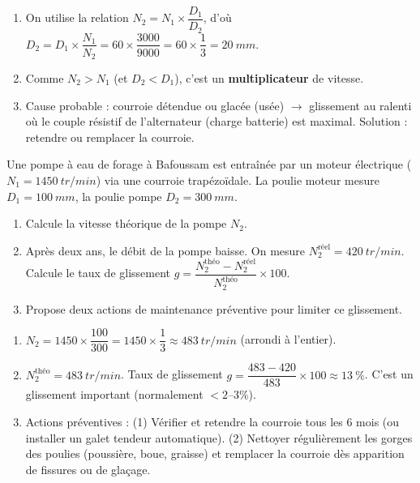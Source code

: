 \documentclass[11pt]{article}
\begin{document}
\begin{corrige}
\begin{enumerate}
\item On utilise la relation $N_2 = N_1 \times \dfrac{D_1}{D_2}$, d'où $D_2 = D_1 \times \dfrac{N_1}{N_2} = 60 \times \dfrac{3000}{9000} = 60 \times \dfrac{1}{3} = \SI{20}{mm}$.
\item Comme $N_2 > N_1$ (et $D_2 < D_1$), c'est un \textbf{multiplicateur} de vitesse.
\item Cause probable : courroie détendue ou glacée (usée) $\rightarrow$ glissement au ralenti où le couple résistif de l'alternateur (charge batterie) est maximal. Solution : retendre ou remplacer la courroie.
\end{enumerate}
\end{corrige}

\begin{exercice}
Une pompe à eau de forage à Bafoussam est entraînée par un moteur électrique ($N_1 = \SI{1450}{tr/min}$) via une courroie trapézoïdale. La poulie moteur mesure $D_1 = \SI{100}{mm}$, la poulie pompe $D_2 = \SI{300}{mm}$.
\begin{enumerate}
\item Calcule la vitesse théorique de la pompe $N_2$.
\item Après deux ans, le débit de la pompe baisse. On mesure $N_2^{\text{réel}} = \SI{420}{tr/min}$. Calcule le taux de glissement $g = \dfrac{N_2^{\text{théo}} - N_2^{\text{réel}}}{N_2^{\text{théo}}} \times 100$.
\item Propose deux actions de maintenance préventive pour limiter ce glissement.
\end{enumerate}
\end{exercice}

\begin{corrige}
\begin{enumerate}
\item $N_2 = 1450 \times \dfrac{100}{300} = 1450 \times \dfrac{1}{3} \approx \SI{483}{tr/min}$ (arrondi à l'entier).
\item $N_2^{\text{théo}} = \SI{483}{tr/min}$. Taux de glissement $g = \dfrac{483 - 420}{483} \times 100 \approx \SI{13}{\%}$. C'est un glissement important (normalement $< 2\text{--}3\%$).
\item Actions préventives : (1) Vérifier et retendre la courroie tous les 6 mois (ou installer un galet tendeur automatique). (2) Nettoyer régulièrement les gorges des poulies (poussière, boue, graisse) et remplacer la courroie dès apparition de fissures ou de glaçage.
\end{enumerate}
\end{corrige}
\end{document}
